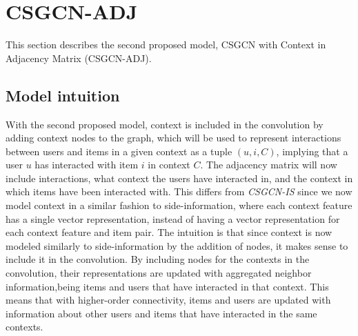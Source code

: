 



\section{CSGCN-ADJ}\label{sec:csgcn_adj}
This section describes the second proposed model, CSGCN with Context in Adjacency Matrix (CSGCN-ADJ).

\subsection{Model intuition}\label{subsec:csgcn_adj_intuition}
With the second proposed model, context is included in the convolution by adding context nodes to the graph, which will be used to represent interactions between users and items in a given context as a tuple $(u,i,C)$, implying that a user $u$ has interacted with item $i$ in context $C$.
The adjacency matrix will now include interactions, what context the users have interacted in, and the context in which items have been interacted with.
This differs from \textit{CSGCN-IS} since we now model context in a similar fashion to side-information, where each context feature has a single vector representation, instead of having a vector representation for each context feature and item pair.
The intuition is that since context is now modeled similarly to side-information by the addition of nodes, it makes sense to include it in the convolution.
By including nodes for the contexts in the convolution, their representations are updated with aggregated neighbor information,being items and users that have interacted in that context.
This means that with higher-order connectivity, items and users are updated with information about other users and items that have interacted in the same contexts.

